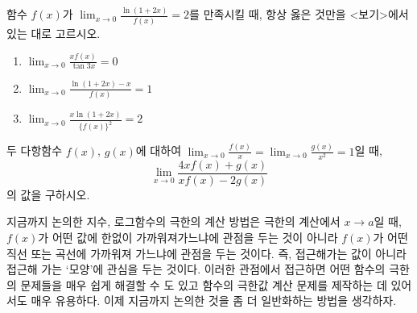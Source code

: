 \documentclass[11pt, a4paper]{book}
\begin{document}
\vskip 10pt
\begin{problem}
함수 $f(x)$가 $\displaystyle\lim_{x\to 0}\frac{\ln(1+2x)}{f(x)}=2$를 만족시킬 때, 항상 옳은 것만을 <보기>에서 있는 대로 고르시오.
\begin{tcolorbox}[enhanced,attach boxed title to top center={yshift=-3mm,yshifttext=-1mm},
	colback=blue!10!white,colframe=blue!75!black,colbacktitle=black!40!white,
	title=< 보기 >, fonttitle=\bfseries,
	boxed title style={size=small,colframe=red!50!white}]
	\begin{enumerate}	
		\item $\displaystyle\lim_{x\to 0}\frac{xf(x)}{\tan 3x}=0$
		
		\item $\displaystyle\lim_{x\to 0}\frac{\ln(1+2x)-x}{f(x)}=1$
		
		\item $\displaystyle\lim_{x\to 0}\frac{x\ln(1+2x)}{\{f(x)\}^{2}}=2$
	\end{enumerate}
\end{tcolorbox}
\end{problem}
\vskip 10pt
\begin{problem}
두 다항함수 $f(x)$, $g(x)$에 대하여 $\displaystyle\lim_{x\to 0}\frac{f(x)}{x}=\displaystyle\lim_{x\to 0}\frac{g(x)}{x^{2}}=1$일 때, 
\[
\displaystyle\lim_{x\to 0}\frac{4xf(x)+g(x)}{xf(x)-2g(x)}
\]
의 값을 구하시오.
\end{problem}
\vskip 10pt

지금까지 논의한 지수, 로그함수의 극한의 계산 방법은 극한의 계산에서 $x\to a$일 때, $f(x)$가 어떤 값에 한없이 가까워져가느냐에 관점을 두는 것이 아니라 $f(x)$가 어떤 직선 또는 곡선에 가까워져 가느냐에 관점을 두는 것이다. 즉, 접근해가는 값이 아니라 접근해 가는 {\color{red}‘모양’}에 관심을 두는 것이다. 이러한 관점에서 접근하면 어떤 함수의 극한의 문제들을 매우 쉽게 해결할 수 도 있고 함수의 극한값 계산 문제를 제작하는 데 있어서도 매우 유용하다. 이제 지금까지 논의한 것을 좀 더 일반화하는 방법을 생각하자.
\end{document}
